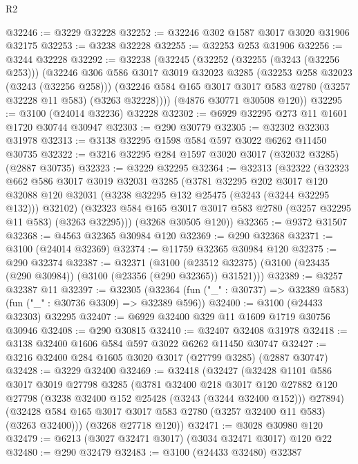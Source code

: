 \begin{lexlean}{R2}
\begin{coremodule}
@32246 := @3229 @32228
@32252 := @32246 @302 @1587 @3017 @3020 @31906 @32175
@32253 := @3238 @32228
@32255 := @32253 @253 @31906
@32256 := @3244 @32228
@32292 := @32238
    (@32245
      (@32252
        (@32255 (@3243 (@32256 @253)))
        (@32246
          @306
          @586
          @3017
          @3019
          @32023
          @3285
          (@32253 @258 @32023 (@3243 (@32256 @258)))
          (@32246 @584 @165 @3017 @3017 @583 @2780 (@3257 @32228 @11 @583) (@3263 @32228))))
      (@4876 @30771 @30508 @120))
@32295 := @3100 (@24014 @32236) @32228
@32302 := @6929 @32295 @273 @11 @1601 @1720 @30744 @30947
@32303 := @290 @30779
@32305 := @32302 @32303 @31978
@32313 := @3138 @32295 @1598 @584 @597 @3022 @6262 @11450 @30735
@32322 := @3216 @32295 @284 @1597 @3020 @3017 (@32032 @3285) (@2887 @30735)
@32323 := @3229 @32295
@32364 := @32313
    (@32322
      (@32323
        @662
        @586
        @3017
        @3019
        @32031
        @3285
        (@3781
          @32295
          @202
          @3017
          @120
          @32088
          @120
          @32031
          (@3238 @32295 @132 @25475 (@3243 (@3244 @32295 @132)))
          @32102)
        (@32323 @584 @165 @3017 @3017 @583 @2780 (@3257 @32295 @11 @583) (@3263 @32295)))
      (@3268 @30505 @120))
@32365 := @9372 @31507
@32368 := @4563 @32365 @30984 @120
@32369 := @290 @32368
@32371 := @3100 (@24014 @32369)
@32374 := @11759 @32365 @30984 @120
@32375 := @290 @32374
@32387 := @32371
    (@3100 (@23512 @32375) (@3100 (@23435 (@290 @30984)) (@3100 (@23356 (@290 @32365)) @31521)))
@32389 := @3257 @32387 @11
@32397 := @32305
    (@32364 (fun ("_" : @30737) => @32389 @583) (fun ("_" : @30736 @3309) => @32389 @596))
@32400 := @3100 (@24433 @32303) @32295
@32407 := @6929 @32400 @329 @11 @1609 @1719 @30756 @30946
@32408 := @290 @30815
@32410 := @32407 @32408 @31978
@32418 := @3138 @32400 @1606 @584 @597 @3022 @6262 @11450 @30747
@32427 := @3216 @32400 @284 @1605 @3020 @3017 (@27799 @3285) (@2887 @30747)
@32428 := @3229 @32400
@32469 := @32418
    (@32427
      (@32428
        @1101
        @586
        @3017
        @3019
        @27798
        @3285
        (@3781
          @32400
          @218
          @3017
          @120
          @27882
          @120
          @27798
          (@3238 @32400 @152 @25428 (@3243 (@3244 @32400 @152)))
          @27894)
        (@32428 @584 @165 @3017 @3017 @583 @2780 (@3257 @32400 @11 @583) (@3263 @32400)))
      (@3268 @27718 @120))
@32471 := @3028 @30980 @120
@32479 := @6213 (@3027 @32471 @3017) (@3034 @32471 @3017) @120 @22
@32480 := @290 @32479
@32483 := @3100 (@24433 @32480) @32387

\end{coremodule}
\end{lexlean}
